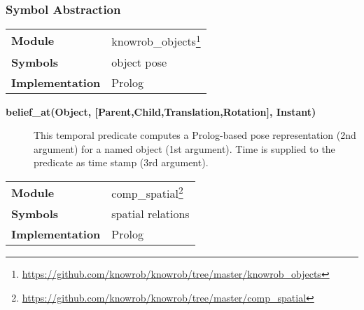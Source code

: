 \subsubsection{Symbol Abstraction}
\begin{center}
\begin{tabular}{ >{\ttfamily\bf}p{3.5cm} >{\ttfamily}p{8.2cm} }
\toprule
Module  & knowrob\_objects\footnote{\url{https://github.com/knowrob/knowrob/tree/master/knowrob\_objects}} \\
Symbols & object pose \\
Implementation & Prolog \\
\bottomrule
\end{tabular}
\end{center}
\begin{description}
\item[\textbf{belief\_at(Object, [Parent,Child,Translation,Rotation], Instant)}]
This temporal predicate computes a Prolog-based pose representation (2nd argument)
for a named object (1st argument). Time is supplied to the predicate as time stamp
(3rd argument).
\end{description}

\begin{center}
\begin{tabular}{ >{\ttfamily\bf}p{3.5cm} >{\ttfamily}p{8.2cm} }
\toprule
Module  & comp\_spatial\footnote{\url{https://github.com/knowrob/knowrob/tree/master/comp\_spatial}} \\
Symbols & spatial relations \\
Implementation & Prolog \\
\bottomrule
\end{tabular}
\end{center}


